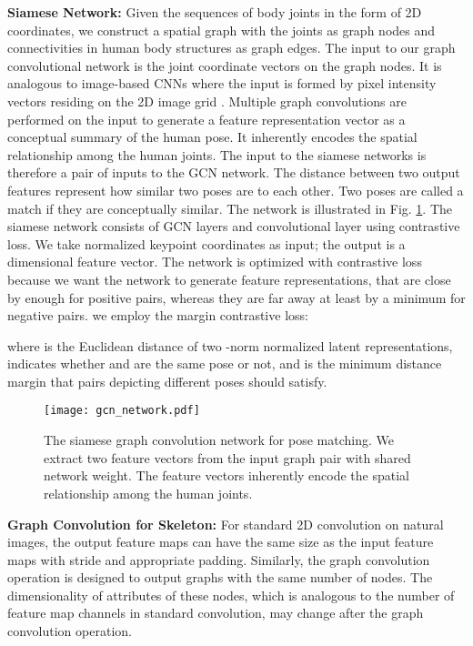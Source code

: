 \documentclass[10pt,twocolumn,letterpaper]{article}
\begin{document}
	\smallskip
	\noindent\textbf{Siamese Network:} 
	Given the sequences of body joints in the form of 2D coordinates, we construct a spatial graph with the joints as graph nodes and connectivities in human body structures as graph edges. 
	The input to our graph convolutional network is the joint coordinate vectors on the graph nodes. It is analogous to image-based CNNs where the input is formed by pixel intensity vectors residing on the 2D image grid \cite{stgcn2018aaai}.
	Multiple graph convolutions are performed on the input to generate a feature representation vector as a conceptual summary of the human pose. It inherently encodes the spatial relationship among the human joints.
	The input to the siamese networks is therefore a pair of inputs to the GCN network. The distance between two output features represent how similar two poses are to each other. Two poses are called a match if they are conceptually similar.  
	The network is illustrated in Fig. \ref{fig:gcn_network}.
	The siamese network consists of  GCN layers and  convolutional layer using contrastive loss. We take normalized keypoint coordinates as input; the output is a  dimensional feature vector. The network is optimized with contrastive loss  because we want the network to generate feature representations, that are close by enough for positive pairs, whereas they are far away at least by a minimum for negative pairs. we employ the margin contrastive loss: 

where  is the Euclidean distance of two -norm normalized latent representations,  indicates whether  and  are the same pose or not, and  is the minimum distance margin that pairs depicting different poses should satisfy.
	
	\begin{figure}
		\vspace{-.25in}
		\centering
		\texttt{[image: gcn\_network.pdf]}
		\caption{The siamese graph convolution network for pose matching. We extract two feature vectors from the input graph pair with shared network weight. The feature vectors inherently encode the spatial relationship among the human joints.} 
		\label{fig:gcn_network}
		\vspace{-.15in}
	\end{figure}
	
	
	
	\noindent\textbf{Graph Convolution for Skeleton:} 
	For standard 2D convolution on natural images, the output feature maps can have the same size as the input feature maps with stride  and appropriate padding. Similarly, the graph convolution operation is designed to output graphs with the same number of nodes. The dimensionality of attributes of these nodes, which is analogous to the number of feature map channels in standard convolution, may change after the graph convolution operation.
	
\end{document}
